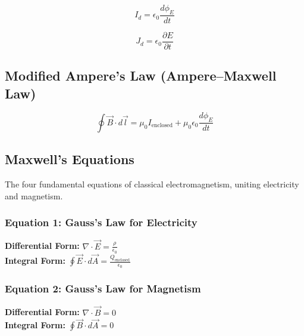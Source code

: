 \documentclass[11pt,a4paper]{article}
\begin{document}
\begin{formulabox}
    \[ I_d = \epsilon_0 \frac{d\phi_E}{dt} \]
\end{formulabox}

\begin{formulabox}
    \[ J_d = \epsilon_0 \frac{\partial E}{\partial t} \]
\end{formulabox}

\subsection{Modified Ampere's Law (Ampere--Maxwell Law)}
\begin{formulabox}
    \[ \oint \vec{B} \cdot d\vec{l} = \mu_0 I_{\text{enclosed}} + \mu_0 \epsilon_0 \frac{d\phi_E}{dt} \]
\end{formulabox}

\subsection{Maxwell's Equations}
\begin{pyqbox}
    The four fundamental equations of classical electromagnetism, uniting electricity and magnetism.
\end{pyqbox}

\subsubsection{Equation 1: Gauss's Law for Electricity}
\begin{formulabox}
    \textbf{Differential Form:} $\nabla \cdot \vec{E} = \frac{\rho}{\epsilon_0}$ \\[0.1cm]
    \textbf{Integral Form:} $\oint \vec{E} \cdot d\vec{A} = \frac{Q_{\text{enclosed}}}{\epsilon_0}$
\end{formulabox}

\subsubsection{Equation 2: Gauss's Law for Magnetism}
\begin{formulabox}
    \textbf{Differential Form:} $\nabla \cdot \vec{B} = 0$ \\[0.1cm]
    \textbf{Integral Form:} $\oint \vec{B} \cdot d\vec{A} = 0$
\end{formulabox}
\end{document}
